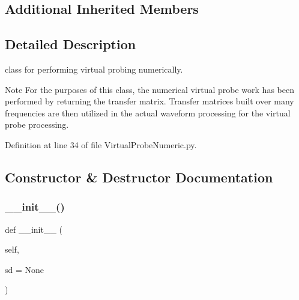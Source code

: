 \subsection*{Additional Inherited Members}


\subsection{Detailed Description}
class for performing virtual probing numerically. 

\begin{DoxyNote}{Note}
For the purposes of this class, the numerical virtual probe work has been performed by returning the transfer matrix. Transfer matrices built over many frequencies are then utilized in the actual waveform processing for the virtual probe processing. 
\end{DoxyNote}


Definition at line 34 of file Virtual\+Probe\+Numeric.\+py.



\subsection{Constructor \& Destructor Documentation}
\mbox{\label{classSignalIntegrity_1_1SystemDescriptions_1_1VirtualProbeNumeric_1_1VirtualProbeNumeric_a2fa2ae61a4511a760e2d2047ec07eb05}} 
\subsubsection{\texorpdfstring{\+\_\+\+\_\+init\+\_\+\+\_\+()}{\_\_init\_\_()}}
{\footnotesize\ttfamily def \+\_\+\+\_\+init\+\_\+\+\_\+ (\begin{DoxyParamCaption}\item[{}]{self,  }\item[{}]{sd = {\ttfamily None} }\end{DoxyParamCaption})}



